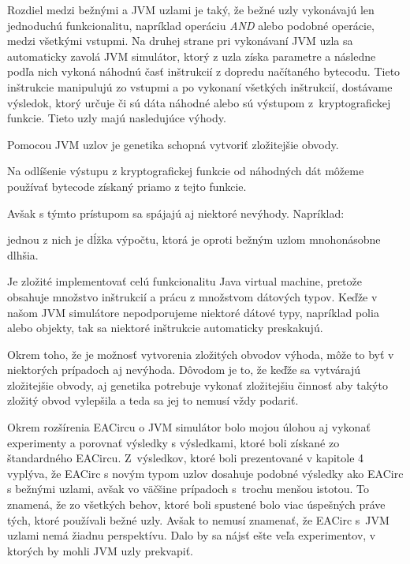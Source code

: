 Rozdiel medzi bežnými a JVM uzlami je taký, že bežné uzly vykonávajú len jednoduchú funkcionalitu, napríklad operáciu \textit{AND} alebo podobné operácie, medzi všetkými vstupmi. Na druhej strane pri vykonávaní JVM uzla sa automaticky zavolá JVM simulátor, ktorý z uzla získa parametre a následne podľa nich vykoná náhodnú časť inštrukcií z dopredu načítaného bytecodu. Tieto inštrukcie manipulujú zo vstupmi a po vykonaní všetkých inštrukcií, dostávame výsledok, ktorý určuje či sú dáta náhodné alebo sú výstupom z~kryptografickej funkcie. Tieto uzly majú nasledujúce výhody.
\begin{myItemize}
	\item Pomocou JVM uzlov je genetika schopná vytvoriť zložitejšie obvody.
	\item Na odlíšenie výstupu z kryptografickej funkcie od náhodných dát môžeme používať bytecode získaný priamo z tejto funkcie.
\end{myItemize}
Avšak s týmto prístupom sa spájajú aj niektoré nevýhody. Napríklad:
\begin{myItemize}
	\item jednou z nich je dĺžka výpočtu, ktorá je oproti bežným uzlom mnohonásobne dlhšia. 
	\item Je zložité implementovať celú funkcionalitu Java virtual machine, pretože obsahuje množstvo inštrukcií a prácu z množstvom dátových typov. Keďže v našom JVM simulátore nepodporujeme niektoré dátové typy, napríklad polia alebo objekty, tak sa niektoré inštrukcie automaticky preskakujú.
	\item Okrem toho, že je možnosť vytvorenia zložitých obvodov výhoda, môže to byť v niektorých prípadoch aj nevýhoda. Dôvodom je to, že keďže sa vytvárajú zložitejšie obvody, aj genetika potrebuje vykonať zložitejšiu činnosť aby takýto zložitý obvod vylepšila a teda sa jej to nemusí vždy podariť. 
\end{myItemize}

Okrem rozšírenia EACircu o JVM simulátor bolo mojou úlohou aj vykonať experimenty a porovnať výsledky s výsledkami, ktoré boli získané zo štandardného EACircu. Z~výsledkov, ktoré boli prezentované v kapitole 4 vyplýva, že EACirc s novým typom uzlov dosahuje podobné výsledky ako EACirc s bežnými uzlami, avšak vo väčšine prípadoch s~trochu menšou istotou. To znamená, že zo všetkých behov, ktoré boli spustené bolo viac úspešných práve tých, ktoré používali bežné uzly. Avšak to nemusí znamenať, že EACirc s~JVM uzlami nemá žiadnu perspektívu. Dalo by sa nájsť ešte veľa experimentov, v ktorých by mohli JVM uzly prekvapiť.

